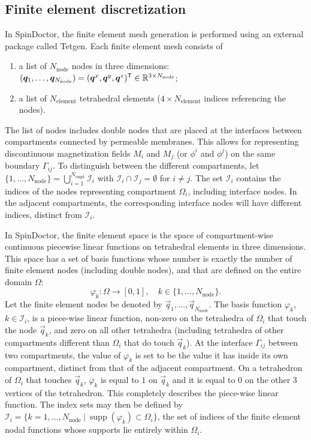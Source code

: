 \documentclass[a4paper]{article}
\begin{document}
\subsection{Finite element discretization}

In SpinDoctor, the finite element mesh generation is performed using an external package called Tetgen\cite{tetgen}. Each finite element mesh consists of
\begin{enumerate}
    \item a list of $N_\text{node}$ nodes in three dimensions: $(\bm{q}_1, \dots, \bm{q}_{N_\text{node}}) = (\bm{q}^x, \bm{q}^y, \bm{q}^z)^{\mathsf{T}} \in \mathbb{R}^{3 \times N_\text{node}}$;
    \item a list of $N_\text{element}$ tetrahedral elements ($4 \times N_\text{element}$ indices referencing the nodes).
\end{enumerate}

The list of nodes includes double nodes that are placed at the interfaces between compartments connected by permeable membranes. This allows for representing discontinuous magnetization fields $M_i$ and $M_j$ (or $\phi^i$ and $\phi^j$) on the same boundary $\Gamma_{i j}$. To distinguish between the different compartments, let $\{1, \dots, N_\text{node}\} = \bigcup_{i = 1}^{N_\text{cmpt}} \mathcal{I}_i$ with $\mathcal{I}_i \cap \mathcal{I}_j = \emptyset$ for $i \neq j$. The set $\mathcal{I}_i$ contains the indices of the nodes representing compartment $\Omega_i$, including interface nodes.  In the adjacent compartments, the corresponding interface nodes will have different indices, distinct from $\mathcal{I}_i$.

In SpinDoctor\cite{lid}, the finite element space is the space of compartment-wise continuous piecewise linear functions on tetrahedral elements in three dimensions. This space has a set of basis functions whose number is exactly the number of finite element nodes (including double nodes), and that are defined on the entire domain $\Omega$:
\begin{equation*}
    \varphi_k : \Omega \to [0, 1], \quad k \in \{1, \dots, N_\text{node}\}.
\end{equation*}
Let the finite element nodes be denoted by $\vec{q}_1, \dots, \vec{q}_{N_\text{node}}$. The basis function $\varphi_k$, $k \in \mathcal{I}_i$, is a piece-wise linear function, non-zero on the tetrahedra of $\Omega_i$ that touch the node $\vec{q}_k$, and zero on all other tetrahedra (including tetrahedra of other compartments different than $\Omega_i$ that do touch $\vec{q}_k$). At the interface $\Gamma_{i j}$ between two compartments, the value of $\varphi_k$ is set to be the value it has inside its own compartment, distinct from that of the adjacent compartment. On a tetrahedron of $\Omega_i$ that touches $\vec{q}_k$, $\varphi_k$ is equal to $1$ on $\vec{q}_k$ and it is equal to $0$ on the other 3 vertices of the tetrahedron. This completely describes the piece-wise linear function. The index sets may then be defined by $\mathcal{I}_i = \{k = 1, \dots, N_\text{node} \ | \ \operatorname{supp}(\varphi_k) \subset \Omega_i\}$, the set of indices of the finite element nodal functions whose supports lie entirely within $\Omega_i$.
\end{document}

